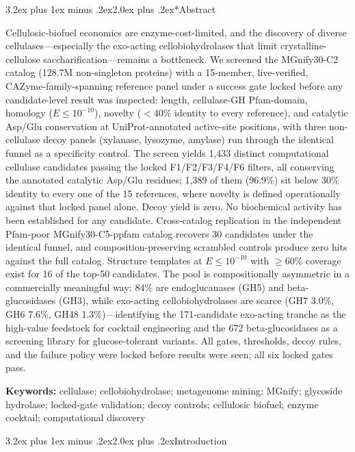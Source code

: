 \documentclass[11pt]{article}
\makeatletter
\renewcommand{\section}{\@startsection{section}{1}{\z@}%
  {3.2ex plus 1ex minus .2ex}{2.0ex plus .2ex}{\Large\bfseries\color{navy}}}
\makeatother
\begin{document}
\section*{Abstract}
Cellulosic-biofuel economics are enzyme-cost-limited, and the discovery of diverse cellulases---especially the exo-acting cellobiohydrolases that limit crystalline-cellulose saccharification---remains a bottleneck. We screened the MGnify30-C2 catalog (128.7M non-singleton proteins) with a 15-member, live-verified, CAZyme-family-spanning reference panel under a success gate locked before any candidate-level result was inspected: length, cellulase-GH Pfam-domain, homology ($E \le 10^{-10}$), novelty ($<$40\% identity to every reference), and catalytic Asp/Glu conservation at UniProt-annotated active-site positions, with three non-cellulase decoy panels (xylanase, lysozyme, amylase) run through the identical funnel as a specificity control. The screen yields 1,433 distinct computational cellulase candidates passing the locked F1/F2/F3/F4/F6 filters, all conserving the annotated catalytic Asp/Glu residues; 1,389 of them (96.9\%) sit below 30\% identity to every one of the 15 references, where novelty is defined operationally against that locked panel alone. Decoy yield is zero. No biochemical activity has been established for any candidate. Cross-catalog replication in the independent Pfam-poor MGnify30-C5-ppfam catalog recovers 30 candidates under the identical funnel, and composition-preserving scrambled controls produce zero hits against the full catalog. Structure templates at $E \le 10^{-10}$ with $\ge$60\% coverage exist for 16 of the top-50 candidates. The pool is compositionally asymmetric in a commercially meaningful way: 84\% are endoglucanases (GH5) and beta-glucosidases (GH3), while exo-acting cellobiohydrolases are scarce (GH7 3.0\%, GH6 7.6\%, GH48 1.3\%)---identifying the 171-candidate exo-acting tranche as the high-value feedstock for cocktail engineering and the 672 beta-glucosidases as a screening library for glucose-tolerant variants. All gates, thresholds, decoy rules, and the failure policy were locked before results were seen; all six locked gates pass.

\medskip
\noindent\textbf{Keywords:} cellulase; cellobiohydrolase; metagenome mining; MGnify; glycoside hydrolase; locked-gate validation; decoy controls; cellulosic biofuel; enzyme cocktail; computational discovery

\section{Introduction}
\end{document}
